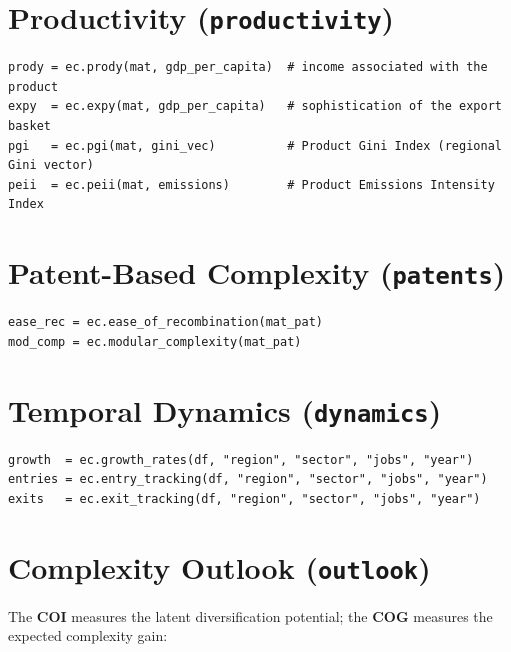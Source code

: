 \documentclass[12pt, a4paper]{article}
\begin{document}
\section{Productivity (\texttt{productivity})}

\begin{lstlisting}[caption={Productivity and product inequality}]
prody = ec.prody(mat, gdp_per_capita)  # income associated with the product
expy  = ec.expy(mat, gdp_per_capita)   # sophistication of the export basket
pgi   = ec.pgi(mat, gini_vec)          # Product Gini Index (regional Gini vector)
peii  = ec.peii(mat, emissions)        # Product Emissions Intensity Index
\end{lstlisting}

\section{Patent-Based Complexity (\texttt{patents})}

\begin{lstlisting}[caption={Patent indicators (input: patent x technology matrix)}]
ease_rec = ec.ease_of_recombination(mat_pat)
mod_comp = ec.modular_complexity(mat_pat)
\end{lstlisting}

\section{Temporal Dynamics (\texttt{dynamics})}

\begin{lstlisting}[caption={Growth rates and entry/exit tracking}]
growth  = ec.growth_rates(df, "region", "sector", "jobs", "year")
entries = ec.entry_tracking(df, "region", "sector", "jobs", "year")
exits   = ec.exit_tracking(df, "region", "sector", "jobs", "year")
\end{lstlisting}

\section{Complexity Outlook (\texttt{outlook})}

The \textbf{COI} measures the latent diversification potential;
the \textbf{COG} measures the expected complexity gain:
\end{document}
